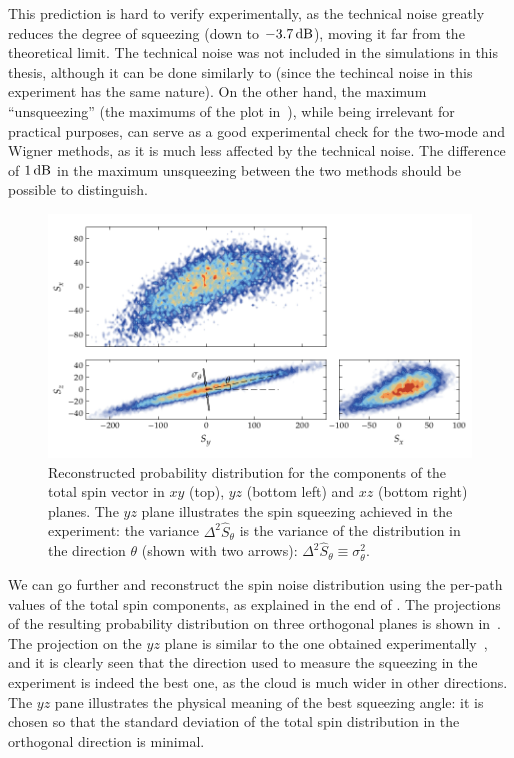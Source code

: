 This prediction is hard to verify experimentally, as the technical noise greatly reduces the degree of squeezing (down to $-3.7\mbox{\ensuremath{\,\mathrm{dB}}}$), moving it far from the theoretical limit.
The technical noise was not included in the simulations in this thesis, although it can be done similarly to  (since the techincal noise in this experiment has the same nature).
On the other hand, the maximum ``unsqueezing'' (the maximums of the plot in~), while being irrelevant for practical purposes, can serve as a good experimental check for the two-mode and Wigner methods, as it is much less affected by the technical noise.
The difference of $1\mbox{\ensuremath{\,\mathrm{dB}}}$ in the maximum unsqueezing between the two methods should be possible to distinguish.

\begin{figure}
    \centerline{\includegraphics{figures_generated/bec_squeezing/riedel_cloud.pdf}}

    \caption[Orthogonal projections of total spin uncertainty cloud]{
    Reconstructed probability distribution for the components of the total spin vector in $xy$ (top), $yz$ (bottom left) and $xz$ (bottom right) planes.
    The $yz$ plane illustrates the spin squeezing achieved in the experiment: the variance $\Delta^2 \hat{S}_\theta$ is the variance of the distribution in the direction $\theta$ (shown with two arrows): $\Delta^2 \hat{S}_\theta \equiv \sigma_\theta^2$.}%
    \label{fig:bec-squeezing:separation:cloud}
\end{figure}

We can go further and reconstruct the spin noise distribution using the per-path values of the total spin components, as explained in the end of .
The projections of the resulting probability distribution on three orthogonal planes is shown in~.
The projection on the $yz$ plane is similar to the one obtained experimentally~\cite{Riedel2010}, and it is clearly seen that the direction used to measure the squeezing in the experiment is indeed the best one, as the cloud is much wider in other directions.
The $yz$ pane illustrates the physical meaning of the best squeezing angle: it is chosen so that the standard deviation of the total spin distribution in the orthogonal direction is minimal.
